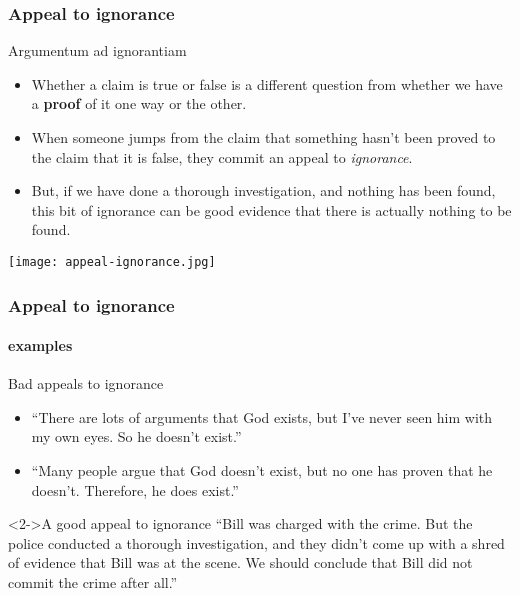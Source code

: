 \documentclass[10pt,letterpaper,xcolor=dvipsnames,handout]{beamer}
\begin{document}
\begin{frame}
  \frametitle{Appeal to ignorance}
  
  \begin{block}{Argumentum ad ignorantiam}
    \begin{itemize}
      \item Whether a claim is true or false is a different question from whether we have a \textbf{proof} of it one way or the other.
      \item When someone jumps from the claim that something hasn't been proved to the claim that it is false, they commit an appeal to \textit{ignorance}.
      \item But, if we have done a thorough investigation, and nothing has been found, this bit of ignorance can be good evidence that there is actually nothing to be found.
    \end{itemize}
  \end{block}
  
  \begin{center}
    \texttt{[image: appeal-ignorance.jpg]}
  \end{center}
  
\end{frame}

\begin{frame}
  \frametitle{Appeal to ignorance}
  \framesubtitle{examples}
  
  \begin{block}{Bad appeals to ignorance}
    \begin{itemize}
      \item ``There are lots of arguments that God exists, but I've never seen him with my own eyes.  So he doesn't exist.''
      \item ``Many people argue that God doesn't exist, but no one has proven that he doesn't.  Therefore, he does exist.''
    \end{itemize}
  \end{block}
  
  \begin{block}<2->{A good appeal to ignorance}
    ``Bill was charged with the crime.  But the police conducted a thorough investigation, and they didn't come up with a shred of evidence that Bill was at the scene.  We should conclude that Bill did not commit the crime after all.''
  \end{block}
  
\end{frame}
\end{document}
